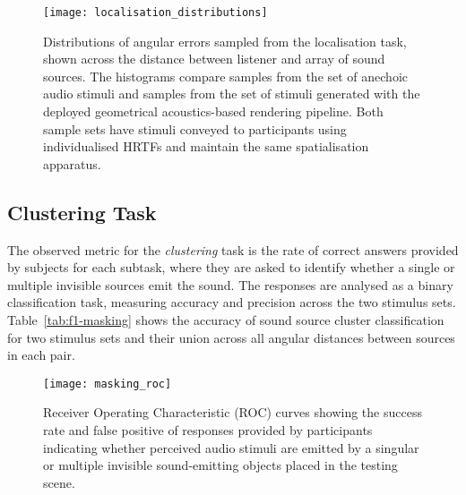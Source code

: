 \begin{figure}[htbp]
    \centering
    \texttt{[image: localisation\_distributions]}
    \caption[Psychoacoustic test results --- localisation accuracy distributions]{Distributions of angular errors sampled from the localisation task, shown across the distance between listener and array of sound sources. The histograms compare samples from the set of anechoic audio stimuli and samples from the set of stimuli generated with the deployed geometrical acoustics-based rendering pipeline. Both sample sets have stimuli conveyed to participants using individualised HRTFs and maintain the same spatialisation apparatus.}\label{fig:localisation-distributions}
\end{figure}

\subsection{Clustering Task}
The observed metric for the \emph{clustering} task is the rate of correct answers provided by subjects for each subtask, where they are asked to identify whether a single or multiple invisible sources emit the sound. The responses are analysed as a binary classification task, measuring accuracy and precision across the two stimulus sets. Table~\ref{tab:f1-masking} shows the accuracy of sound source cluster classification for two stimulus sets and their union across all angular distances between sources in each pair.
\begin{figure}[htbp]
    \centering
    \texttt{[image: masking\_roc]}
    \caption[Psychoacoustic test results --- clustering accuracy]{Receiver Operating Characteristic (ROC) curves showing the success rate and false positive of responses provided by participants indicating whether perceived audio stimuli are emitted by a singular or multiple invisible sound-emitting objects placed in the testing scene.}\label{fig:masking-roc}
\end{figure}

